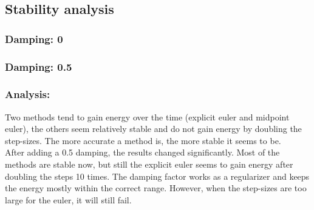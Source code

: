 \documentclass{article}
\begin{document}
\subsection{Stability analysis}
\subsubsection{Damping: 0}

\subsubsection{Damping: 0.5}

\subsubsection{Analysis:}
Two methods tend to gain energy over the time (explicit euler and midpoint euler), the others seem relatively stable and do not gain energy by doubling the step-sizes. The more accurate a method is, the more stable it seems to be. \\
After adding a 0.5 damping, the results changed significantly. Most of the methods are stable now, but still the explicit euler seems to gain energy after doubling the steps 10 times. The damping factor works as a regularizer and keeps the energy mostly within the correct range. However, when the step-sizes are too large for the euler, it will still fail.
\end{document}
